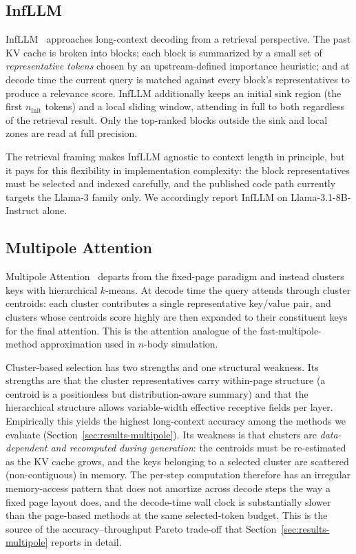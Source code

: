 \subsection{InfLLM}\label{sec:rel-infllm}

InfLLM~\cite{xiao2024infllm} approaches long-context decoding from a
retrieval perspective.  The past KV cache is broken into blocks; each
block is summarized by a small set of \emph{representative tokens}
chosen by an upstream-defined importance heuristic; and at decode
time the current query is matched against every block's
representatives to produce a relevance score.  InfLLM additionally
keeps an initial sink region (the first $n_\text{init}$ tokens) and a
local sliding window, attending in full to both regardless of the
retrieval result.  Only the top-ranked blocks outside the sink and
local zones are read at full precision.

The retrieval framing makes InfLLM agnostic to context length in
principle, but it pays for this flexibility in implementation
complexity: the block representatives must be selected and indexed
carefully, and the published code path currently targets the Llama-3
family only.  We accordingly report InfLLM on Llama-3.1-8B-Instruct
alone.

\subsection{Multipole Attention}\label{sec:rel-multipole}

Multipole Attention~\cite{hooper2025multipole} departs from the
fixed-page paradigm and instead clusters keys with hierarchical
$k$-means.  At decode time the query attends through cluster
centroids: each cluster contributes a single representative key/value
pair, and clusters whose centroids score highly are then expanded to
their constituent keys for the final attention.  This is the
attention analogue of the fast-multipole-method approximation used in
$n$-body simulation.

Cluster-based selection has two strengths and one structural
weakness.  Its strengths are that the cluster representatives carry
within-page structure (a centroid is a positionless but
distribution-aware summary) and that the hierarchical structure
allows variable-width effective receptive fields per layer.
Empirically this yields the highest long-context accuracy among the
methods we evaluate (Section~\ref{sec:results-multipole}).  Its
weakness is that clusters are \emph{data-dependent and recomputed
during generation}: the centroids must be re-estimated as the KV
cache grows, and the keys belonging to a selected cluster are
scattered (non-contiguous) in memory.  The per-step computation
therefore has an irregular memory-access pattern that does not
amortize across decode steps the way a fixed page layout does, and
the decode-time wall clock is substantially slower than the
page-based methods at the same selected-token budget.
This is the source of the accuracy--throughput Pareto trade-off that
Section~\ref{sec:results-multipole} reports in detail.



